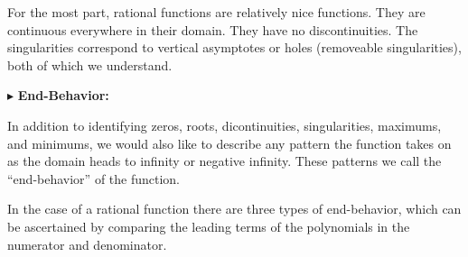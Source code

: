 \documentclass{ximera}
\begin{document}
For the most part, rational functions are relatively nice functions.  They are continuous everywhere in their domain.  They have no discontinuities.  The singularities correspond to vertical asymptotes or holes (removeable singularities), both of which we understand.  










$\blacktriangleright$ \textbf{\textcolor{red!10!blue!90!}{End-Behavior:}} 

In addition to identifying zeros, roots, dicontinuities, singularities, maximums, and minimums, we would also like to describe any pattern the function takes on as the domain heads to infinity or negative infinity.  These patterns we call the ``end-behavior'' of the function.  

In the case of a rational function there are three types of end-behavior, which can be ascertained by comparing the leading terms of the polynomials in the numerator and denominator.
\end{document}
